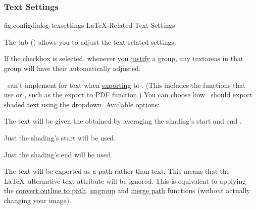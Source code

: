 \subsubsection{Text Settings}\label{sec:texconfigtext}


\FloatFig
  {fig:configdialog-texsettings}
  {}
  {LaTeX-Related Text Settings}

The  tab
()
allows you to adjust the text-related settings.


If the  \gls{checkbox} is selected,
whenever you \hyperref[sec:alignobjects]{justify} a \gls{group}, any
\glspl{textarea} in that group will have their
 automatically adjusted.


\FlowframTk\ can't implement  for text when
\hyperref[sec:exportpgf]{exporting} to . (This includes the
 functions that use  or , such as
the export to PDF function.) You can choose how \FlowframTk\ should export
shaded text using the 
\gls*{dropdown}. Available options:

\begin{deflist}
\itemtitle
 {}

\begin{itemdesc}
The text will be given the  obtained by averaging the
shading's start and end .
\end{itemdesc}

\itemtitle
 {}

\begin{itemdesc}
Just the shading's start  will be used.
\end{itemdesc}

\itemtitle
 {}

\begin{itemdesc}
Just the shading's end  will be used.
\end{itemdesc}

\itemtitle
 {}

\begin{itemdesc}
The text will be exported as a path rather than text. This means
that the \LaTeX\ alternative text attribute will be ignored. This is
equivalent to applying the 
\hyperref[sec:outlinetopath]{convert outline to path}, 
\hyperref[sec:grouping]{ungroup} and 
\hyperref[sec:mergepaths]{merge path}
functions (without actually changing your image).
\end{itemdesc}

\end{deflist}

